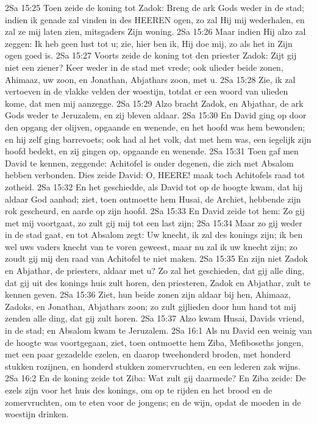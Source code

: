 2Sa 15:25  Toen zeide de koning tot Zadok: Breng de ark Gods weder in de stad; indien ik genade zal vinden in des HEEREN ogen, zo zal Hij mij wederhalen, en zal ze mij laten zien, mitsgaders Zijn woning.
2Sa 15:26  Maar indien Hij alzo zal zeggen: Ik heb geen lust tot u; zie, hier ben ik, Hij doe mij, zo als het in Zijn ogen goed is.
2Sa 15:27  Voorts zeide de koning tot den priester Zadok: Zijt gij niet een ziener? Keer weder in de stad met vrede; ook ulieder beide zonen, Ahimaaz, uw zoon, en Jonathan, Abjathars zoon, met u.
2Sa 15:28  Zie, ik zal vertoeven in de vlakke velden der woestijn, totdat er een woord van ulieden kome, dat men mij aanzegge.
2Sa 15:29  Alzo bracht Zadok, en Abjathar, de ark Gods weder te Jeruzalem, en zij bleven aldaar.
2Sa 15:30  En David ging op door den opgang der olijven, opgaande en wenende, en het hoofd was hem bewonden; en hij zelf ging barrevoets; ook had al het volk, dat met hem was, een iegelijk zijn hoofd bedekt, en zij gingen op, opgaande en wenende.
2Sa 15:31  Toen gaf men David te kennen, zeggende: Achitofel is onder degenen, die zich met Absalom hebben verbonden. Dies zeide David: O, HEERE! maak toch Achitofels raad tot zotheid.
2Sa 15:32  En het geschiedde, als David tot op de hoogte kwam, dat hij aldaar God aanbad; ziet, toen ontmoette hem Husai, de Archiet, hebbende zijn rok gescheurd, en aarde op zijn hoofd.
2Sa 15:33  En David zeide tot hem: Zo gij met mij voortgaat, zo zult gij mij tot een last zijn;
2Sa 15:34  Maar zo gij weder in de stad gaat, en tot Absalom zegt: Uw knecht, ik zal des konings zijn; ik ben wel uws vaders knecht van te voren geweest, maar nu zal ik uw knecht zijn; zo zoudt gij mij den raad van Achitofel te niet maken.
2Sa 15:35  En zijn niet Zadok en Abjathar, de priesters, aldaar met u? Zo zal het geschieden, dat gij alle ding, dat gij uit des konings huis zult horen, den priesteren, Zadok en Abjathar, zult te kennen geven.
2Sa 15:36  Ziet, hun beide zonen zijn aldaar bij hen, Ahimaaz, Zadoks, en Jonathan, Abjathars zoon; zo zult gijlieden door hun hand tot mij zenden alle ding, dat gij zult horen.
2Sa 15:37  Alzo kwam Husai, Davids vriend, in de stad; en Absalom kwam te Jeruzalem.
2Sa 16:1  Als nu David een weinig van de hoogte was voortgegaan, ziet, toen ontmoette hem Ziba, Mefiboseths jongen, met een paar gezadelde ezelen, en daarop tweehonderd broden, met honderd stukken rozijnen, en honderd stukken zomervruchten, en een lederen zak wijns.
2Sa 16:2  En de koning zeide tot Ziba: Wat zult gij daarmede? En Ziba zeide: De ezels zijn voor het huis des konings, om op te rijden en het brood en de zomervruchten, om te eten voor de jongens; en de wijn, opdat de moeden in de woestijn drinken.
